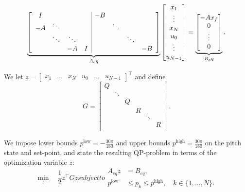 \begin{equation}
	\label{eq:eq_constraints}
	\underbrace{
	\left[\begin{array}{cccc | ccccc}
	I	&&&&			-B	&&&			\\
	-A	&\ddots&&&			&\ddots&&	\\
		&\ddots&\ddots&&	&&\ddots&	\\
		&& -A & I&			&&& -B		\\
	\end{array}\right]}_{A_eq}
\begin{bmatrix} x_1 \\ \vdots \\ x_N \\ u_0 \\ \vdots \\ u_{N-1} \end{bmatrix}
=
\underbrace{
\begin{bmatrix}
-A x_f \\ 0 \\ \vdots \\ 0      
\end{bmatrix}}_{B_eq}.
\end{equation}

We let $z = \begin{bmatrix} x_1 & \dots & x_N & u_0 & \dots & u_{N-1} \end{bmatrix}^\top$ and define
\begin{equation*}
	G =
	\begin{bmatrix}
	Q	&&&&&		\\
		&\ddots&&&&	\\
		&&Q&&&		\\
		&&&R&&		\\
		&&&&\ddots&	\\
		&&&&&R		\\
	\end{bmatrix}.
\end{equation*}

We impose lower bounds $p^{\textrm{low}} = -\frac{30\pi}{180}$ and upper bounds $p^{\textrm{high}} = \frac{30\pi}{180}$ on the pitch state and set-point, and state the resulting QP-problem in terms of the optimization variable $z$:
\begin{subequations}
\label{eq:QP_travel}
\begin{equation}
	\min_z \quad \frac{1}{2} z^\top G z
\end{equation}
	subject to
\begin{align}
	A_{eq} z &= B_{eq}, \\
	p^{\textrm{low}} &\le p_k \le p^{\textrm{high}}, \quad k \in \{1, \dots, N\}.
\end{align}
\end{subequations}

